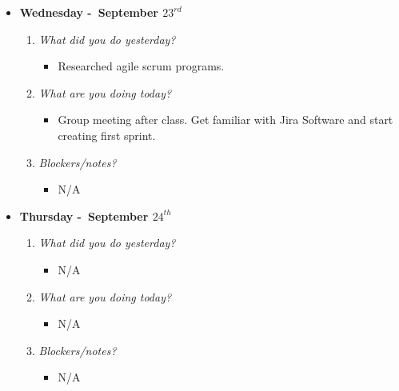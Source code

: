 \begin{itemize}
  \item[] \textbf{\large Wednesday -\ September \(23^{rd}\)}
  \begin{enumerate}
    \item \textsl{What did you do yesterday?}
    \begin{itemize}
      \item Researched agile scrum programs.
    \end{itemize}
    \item \textsl{What are you doing today?}
    \begin{itemize}
      \item Group meeting after class. Get familiar with Jira Software and start creating first sprint.
    \end{itemize}
    \item \textsl{Blockers/notes?}
    \begin{itemize}
      \item N/A
    \end{itemize}
  \end{enumerate}
\end{itemize}
\textbf{}
\begin{itemize}
  \item[] \textbf{\large Thursday -\ September \(24^{th}\)}
  \begin{enumerate}
    \item \textsl{What did you do yesterday?}
    \begin{itemize}
      \item N/A
    \end{itemize}
    \item \textsl{What are you doing today?}
    \begin{itemize}
      \item N/A
    \end{itemize}
    \item \textsl{Blockers/notes?}
    \begin{itemize}
      \item N/A
    \end{itemize}
  \end{enumerate}
\end{itemize}
\textbf{}
